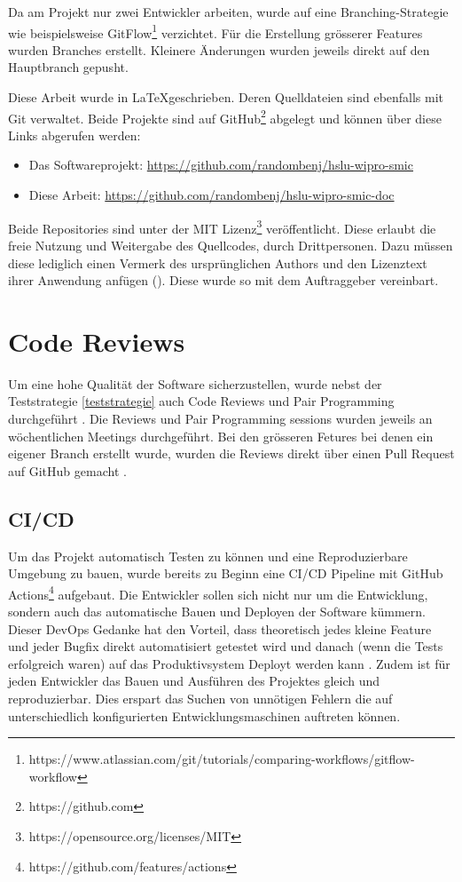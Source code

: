 Da am Projekt nur zwei Entwickler arbeiten,
wurde auf eine Branching-Strategie wie beispielsweise
GitFlow\footnote{https://www.atlassian.com/git/tutorials/comparing-workflows/gitflow-workflow} verzichtet.
Für die Erstellung grösserer Features wurden Branches erstellt.
Kleinere Änderungen wurden jeweils direkt auf den Hauptbranch gepusht.

Diese Arbeit wurde in \LaTeX geschrieben. Deren Quelldateien sind ebenfalls mit Git verwaltet.
Beide Projekte sind auf GitHub\footnote{https://github.com} abgelegt und können über diese Links abgerufen werden:

\begin{itemize}
      \item Das Softwareprojekt: \url{https://github.com/randombenj/hslu-wipro-smic}
      \item Diese Arbeit: \url{https://github.com/randombenj/hslu-wipro-smic-doc}
\end{itemize}

Beide Repositories sind unter der MIT Lizenz\footnote{https://opensource.org/licenses/MIT} veröffentlicht.
Diese erlaubt die freie Nutzung und Weitergabe des Quellcodes, durch Drittpersonen.
Dazu müssen diese lediglich einen Vermerk des ursprünglichen Authors und den Lizenztext ihrer Anwendung anfügen (\parencite{mit_licence}).
Diese wurde so mit dem Auftraggeber vereinbart.

\section{Code Reviews}

Um eine hohe Qualität der Software sicherzustellen, wurde nebst der Teststrategie \ref{teststrategie}
auch Code Reviews und Pair Programming durchgeführt \parencite{fu2017code}.
Die Reviews und Pair Programming sessions wurden jeweils an wöchentlichen
Meetings durchgeführt.
Bei den grösseren Fetures bei denen ein eigener Branch erstellt wurde, wurden die
Reviews direkt über einen Pull Request auf GitHub gemacht \parencite{github_flow_docs_2021}.

\subsection{\ac{CI/CD}}

Um das Projekt automatisch Testen zu können und eine Reproduzierbare Umgebung zu bauen,
wurde bereits zu Beginn eine \ac{CI/CD} Pipeline mit GitHub Actions\footnote{https://github.com/features/actions}
aufgebaut.
Die Entwickler sollen sich nicht nur um die Entwicklung, sondern auch das automatische Bauen und Deployen der
Software kümmern. Dieser DevOps Gedanke hat den Vorteil, dass
theoretisch jedes kleine Feature und jeder Bugfix direkt automatisiert getestet
wird und danach (wenn die Tests erfolgreich waren) auf das Produktivsystem
Deployt werden kann \parencite{what_is_devops}.
Zudem ist für jeden Entwickler das Bauen und Ausführen des Projektes gleich und
reproduzierbar. Dies erspart das Suchen von unnötigen Fehlern die auf unterschiedlich
konfigurierten Entwicklungsmaschinen auftreten können.
